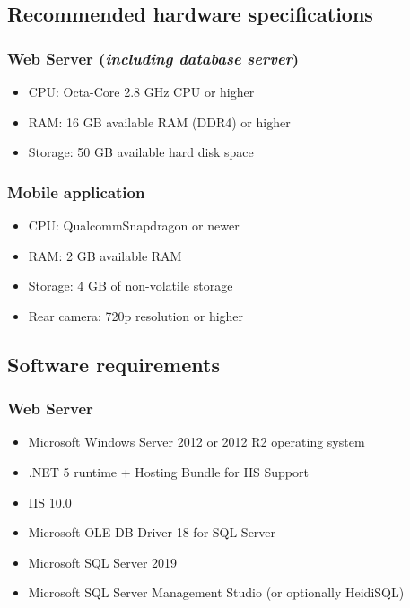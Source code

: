 \subsection{Recommended hardware specifications}

\subsubsection{Web Server (\emph{including database server})} 

\begin{itemize}
	\item CPU: Octa-Core 2.8 GHz CPU or higher
	\item RAM: 16 GB available RAM (DDR4) or higher
	\item Storage: 50 GB available hard disk space
\end{itemize}

\subsubsection{Mobile application}

\begin{itemize}
	\item CPU: Qualcomm\textregistered Snapdragon or newer
	\item RAM: 2 GB available RAM
	\item Storage: 4 GB of non-volatile storage
	\item Rear camera: 720p resolution or higher
\end{itemize}

\subsection{Software requirements}

\subsubsection{Web Server}

\begin{itemize}
	\item Microsoft Windows Server 2012 or 2012 R2 operating system
	\item .NET 5 runtime + Hosting Bundle for IIS Support
	\item IIS 10.0
	\item Microsoft OLE DB Driver 18 for SQL Server
	\item Microsoft SQL Server 2019
	\item Microsoft SQL Server Management Studio (or optionally HeidiSQL)
\end{itemize}

